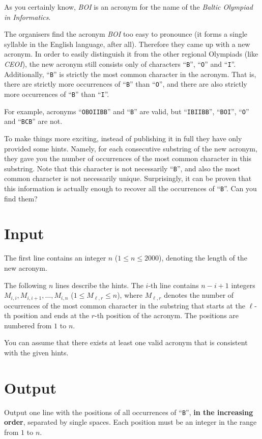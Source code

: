 As you certainly know, \textit{BOI} is an acronym for the name of the \textit{Baltic Olympiad in Informatics}.

The organisers find the acronym \textit{BOI} too easy to pronounce
(it forms a single syllable in the English language, after all).
Therefore they came up with a new acronym.
In order to easily distinguish it from the other regional Olympiads (like \textit{CEOI}),
the new acronym still consists only of characters ``\texttt{B}'', ``\texttt{O}'' and ``\texttt{I}''.
Additionally, ``\texttt{B}'' is strictly the most common character in the acronym.
That is, there are strictly more occurrences of ``\texttt{B}'' than ``\texttt{O}'',
and there are also strictly more occurrences of ``\texttt{B}'' than ``\texttt{I}''.

For example, acronyms ``\texttt{OBOIIBB}'' and ``\texttt{B}'' are valid,
but ``\texttt{IBIIBB}'', ``\texttt{BOI}'', ``\texttt{O}'' and ``\texttt{BCB}'' are not.

To make things more exciting, instead of publishing it in full they have only provided some hints.
Namely, for each consecutive substring of the new acronym, they gave you the number
of occurrences of the most common character in this substring.
Note that this character is not necessarily ``\texttt{B}'', and also the most common character
is not necessarily unique.
Surprisingly, it can be proven that this information is actually enough to recover all the occurrences of ``\texttt{B}''.
Can you find them?

\section*{Input}
The first line contains an integer $n$ ($1\leq n\leq 2000$),
denoting the length of the new acronym.

The following $n$ lines describe the hints.
The $i$-th line contains $n-i+1$ integers $M_{i,i}, M_{i,i+1}, \ldots, M_{i,n}$
($1 \leq M_{\ell,r} \leq n$),
where $M_{\ell,r}$ denotes the number of occurrences of the most common character
in the substring that starts at the $\ell$-th position and ends at the $r$-th position of the acronym.
The positions are numbered from $1$ to $n$.

You can assume that there exists at least one valid acronym that is consistent with the given hints.

\section*{Output}
Output one line with the positions of all occurrences of ``\texttt{B}'',
\textbf{in the increasing order}, separated by single spaces.
Each position must be an integer in the range from $1$ to $n$.

